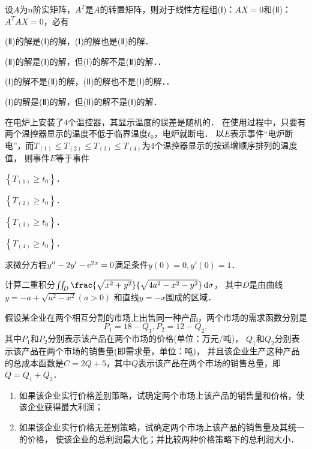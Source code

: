 \documentclass[plain,noanswer,medmath]{../../template/jnuexam}
\begin{document}
\begin{problem}
设$A$为$n$阶实矩阵，$A^T$是$A$的转置矩阵，则对于线性方程组(Ⅰ)：$AX = 0$和(Ⅱ)：$A^T AX = 0$，必有\pickout{}
\begin{abcd}
\item (Ⅱ)的解是(Ⅰ)的解，(Ⅰ)的解也是(Ⅱ)的解．
\item (Ⅱ)的解是(Ⅰ)的解，但(Ⅰ)的解不是(Ⅱ)的解．．
\item (Ⅰ)的解不是(Ⅱ)的解，(Ⅱ)的解也不是(Ⅰ)的解．．
\item (Ⅰ)的解是(Ⅱ)的解，但(Ⅱ)的解不是(Ⅰ)的解．
\end{abcd}
\end{problem}


\begin{problem}
在电炉上安装了$4$个温控器，其显示温度的误差是随机的．
在使用过程中，只要有两个温控器显示的温度不低于临界温度$t_0$，电炉就断电．
以$E$表示事件“电炉断电”，而$T_{(1)} \le T_{(2)} \le T_{(3)} \le T_{(4)}$为$4$个温控器显示的按递增顺序排列的温度值，
则事件$E$等于事件\pickout{}
\begin{abcd}
\item $\left\{T_{(1)} \ge t_0 \right\}$．
\item $\left\{T_{(2)} \ge t_0 \right\}$．
\item $\left\{T_{(3)} \ge t_0 \right\}$．
\item $\left\{T_{(4)} \ge t_0 \right\}$．
\end{abcd}
\end{problem}



\begin{problem}
求微分方程$y'' - 2y' - \mathrm{e}^{2x} = 0$满足条件$y(0) = 0,y'(0) = 1$．
\end{problem}



\begin{problem}
计算二重积分$\iint_D \frac{\sqrt{x^2 + y^2}}{\sqrt{4a^2 - x^2 - y^2}}\d\sigma$，
其中$D$是由曲线$y = - a + \sqrt{a^2 - x^2} (a > 0)$ 和直线$y = - x$围成的区域．
\end{problem}



\begin{problem}
假设某企业在两个相互分割的市场上出售同一种产品，两个市场的需求函数分别是
$$P_1 = 18 - Q_1,P_2 = 12 - Q_2,$$
其中$P_1$和$P_2$分别表示该产品在两个市场的价格(单位：万元/吨)，
$Q_1$和$Q_2$分别表示该产品在两个市场的销售量(即需求量，单位：吨)，
并且该企业生产这种产品的总成本函数是$C = 2Q + 5$，其中$Q$表示该产品在两个市场的销售总量，即$Q = Q_1 + Q_2$．
\begin{enumerate}
\item 如果该企业实行价格差别策略，试确定两个市场上该产品的销售量和价格，使该企业获得最大利润；
\item 如果该企业实行价格无差别策略，试确定两个市场上该产品的销售量及其统一的价格，
      使该企业的总利润最大化；并比较两种价格策略下的总利润大小．
\end{enumerate}

\end{problem}
\end{document}
